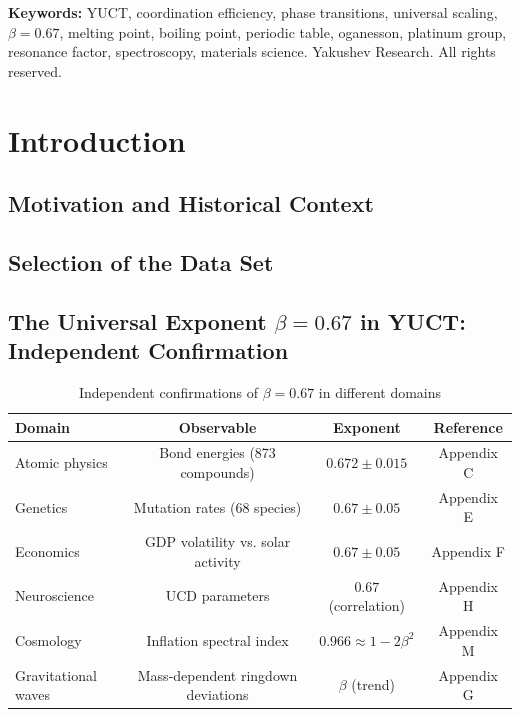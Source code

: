 \documentclass[12pt,a4paper]{article}
\begin{document}
\begin{titlepage}
\begin{center}
\begin{minipage}{0.9\textwidth}
\begin{abstract}
				\end{abstract}
			\end{minipage}
			\vspace{1cm}
			\noindent
			\small\textbf{Keywords:} YUCT, coordination efficiency, phase transitions, universal scaling, \(\beta = 0.67\), melting point, boiling point, periodic table, oganesson, platinum group, resonance factor, spectroscopy, materials science.
			\vspace{0.5cm}
			\noindent
			 Yakushev Research. All rights reserved.
		\end{center}
	\end{titlepage}
	
	\maketitle
	\tableofcontents
	
	\section{Introduction}
	\subsection{Motivation and Historical Context}
	\subsection{Selection of the Data Set}
	\subsection{The Universal Exponent \(\beta = 0.67\) in YUCT: Independent Confirmation}
	
	\begin{table}[htbp]
		\centering
		\caption{Independent confirmations of \(\beta = 0.67\) in different domains}
		\label{tab:beta_confirmation}
		\begin{tabular}{@{}lccc@{}}
			\toprule
			\textbf{Domain} & \textbf{Observable} & \textbf{Exponent} & \textbf{Reference} \\
			\midrule
			Atomic physics & Bond energies (873 compounds) & \(0.672\pm0.015\) & Appendix C \\
			Genetics & Mutation rates (68 species) & \(0.67\pm0.05\) & Appendix E \\
			Economics & GDP volatility vs. solar activity & \(0.67\pm0.05\) & Appendix F \\
			Neuroscience & UCD parameters & \(0.67\) (correlation) & Appendix H \\
			Cosmology & Inflation spectral index & \(0.966 \approx 1-2\beta^2\) & Appendix M \\
			Gravitational waves & Mass‑dependent ringdown deviations & \(\beta\) (trend) & Appendix G \\
			\bottomrule
		\end{tabular}
	\end{table}
	
\end{document}

